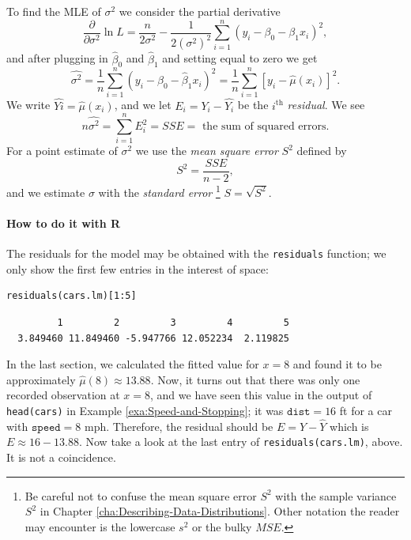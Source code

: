 \documentclass[captions=tableheading]{scrbook}
\begin{document}
To find the MLE of \(\sigma^{2}\) we consider the partial derivative
\begin{equation}
\frac{\partial}{\partial\sigma^{2}}\ln L=\frac{n}{2\sigma^{2}}-\frac{1}{2(\sigma^{2})^{2}}\sum_{i=1}^{n}(y_{i}-\beta_{0}-\beta_{1}x_{i})^{2},
\end{equation}
and after plugging in \(\hat{\beta}_{0}\) and \(\hat{\beta}_{1}\) and setting equal to zero we get
\begin{equation}
\hat{\sigma^{2}}=\frac{1}{n}\sum_{i=1}^{n}(y_{i}-\hat{\beta}_{0}-\hat{\beta}_{1}x_{i})^{2}=\frac{1}{n}\sum_{i=1}^{n}[y_{i}-\hat{\mu}(x_{i})]^{2}.
\end{equation}
We write \(\hat{Yi}=\hat{\mu}(x_{i})\), and we let \(E_{i}=Y_{i}-\hat{Y_{i}}\) be the \(i^{\mathrm{th}}\) \emph{residual}. We see 
\begin{equation}
n\hat{\sigma^{2}}=\sum_{i=1}^{n}E_{i}^{2}=SSE=\mbox{ the sum of squared errors.}
\end{equation}
For a point estimate of \(\sigma^{2}\) we use the \emph{mean square error} \(S^{2}\) defined by 
\begin{equation}
S^{2}=\frac{SSE}{n-2},
\end{equation}
and we estimate \(\sigma\) with the \emph{standard error}
\footnote{Be careful not to confuse the mean square error \(S^{2}\) with the sample variance \(S^{2}\) in Chapter \ref{cha:Describing-Data-Distributions}. Other notation the reader may encounter is the lowercase \(s^{2}\) or the bulky \(MSE\).}
\(S=\sqrt{S^{2}}\).

\paragraph*{How to do it with \textsf{R}}

The residuals for the model may be obtained with the \texttt{residuals} function; we only show the first few entries in the interest of space:


\begin{verbatim}
residuals(cars.lm)[1:5]
\end{verbatim}

\begin{verbatim}
         1         2         3         4         5 
  3.849460 11.849460 -5.947766 12.052234  2.119825
\end{verbatim}



In the last section, we calculated the fitted value for \(x=8\) and found it to be approximately \( \hat{\mu}(8)\approx  13.88 \). Now, it turns out that there was only one recorded observation at \(x = 8\), and we have seen this value in the output of \texttt{head(cars)} in Example \ref{exa:Speed-and-Stopping}; it was \(\mathtt{dist} = 16\) ft for a car with \( \mathtt{speed} = 8 \) mph. Therefore, the residual should be \(E = Y - \hat{Y}\) which is \(E \approx 16 -  13.88 \). Now take a look at the last entry of \texttt{residuals(cars.lm)}, above. It is not a coincidence.
\end{document}
